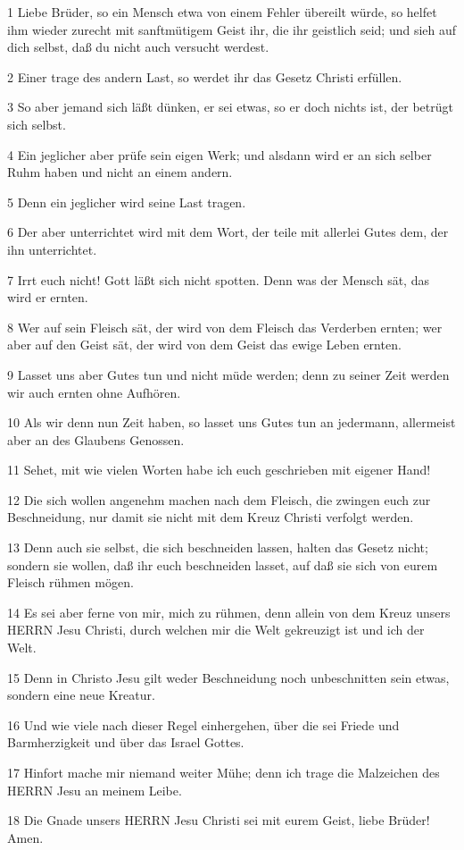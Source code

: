 \par 1 Liebe Brüder, so ein Mensch etwa von einem Fehler übereilt würde, so helfet ihm wieder zurecht mit sanftmütigem Geist ihr, die ihr geistlich seid; und sieh auf dich selbst, daß du nicht auch versucht werdest.
\par 2 Einer trage des andern Last, so werdet ihr das Gesetz Christi erfüllen.
\par 3 So aber jemand sich läßt dünken, er sei etwas, so er doch nichts ist, der betrügt sich selbst.
\par 4 Ein jeglicher aber prüfe sein eigen Werk; und alsdann wird er an sich selber Ruhm haben und nicht an einem andern.
\par 5 Denn ein jeglicher wird seine Last tragen.
\par 6 Der aber unterrichtet wird mit dem Wort, der teile mit allerlei Gutes dem, der ihn unterrichtet.
\par 7 Irrt euch nicht! Gott läßt sich nicht spotten. Denn was der Mensch sät, das wird er ernten.
\par 8 Wer auf sein Fleisch sät, der wird von dem Fleisch das Verderben ernten; wer aber auf den Geist sät, der wird von dem Geist das ewige Leben ernten.
\par 9 Lasset uns aber Gutes tun und nicht müde werden; denn zu seiner Zeit werden wir auch ernten ohne Aufhören.
\par 10 Als wir denn nun Zeit haben, so lasset uns Gutes tun an jedermann, allermeist aber an des Glaubens Genossen.
\par 11 Sehet, mit wie vielen Worten habe ich euch geschrieben mit eigener Hand!
\par 12 Die sich wollen angenehm machen nach dem Fleisch, die zwingen euch zur Beschneidung, nur damit sie nicht mit dem Kreuz Christi verfolgt werden.
\par 13 Denn auch sie selbst, die sich beschneiden lassen, halten das Gesetz nicht; sondern sie wollen, daß ihr euch beschneiden lasset, auf daß sie sich von eurem Fleisch rühmen mögen.
\par 14 Es sei aber ferne von mir, mich zu rühmen, denn allein von dem Kreuz unsers HERRN Jesu Christi, durch welchen mir die Welt gekreuzigt ist und ich der Welt.
\par 15 Denn in Christo Jesu gilt weder Beschneidung noch unbeschnitten sein etwas, sondern eine neue Kreatur.
\par 16 Und wie viele nach dieser Regel einhergehen, über die sei Friede und Barmherzigkeit und über das Israel Gottes.
\par 17 Hinfort mache mir niemand weiter Mühe; denn ich trage die Malzeichen des HERRN Jesu an meinem Leibe.
\par 18 Die Gnade unsers HERRN Jesu Christi sei mit eurem Geist, liebe Brüder! Amen.


